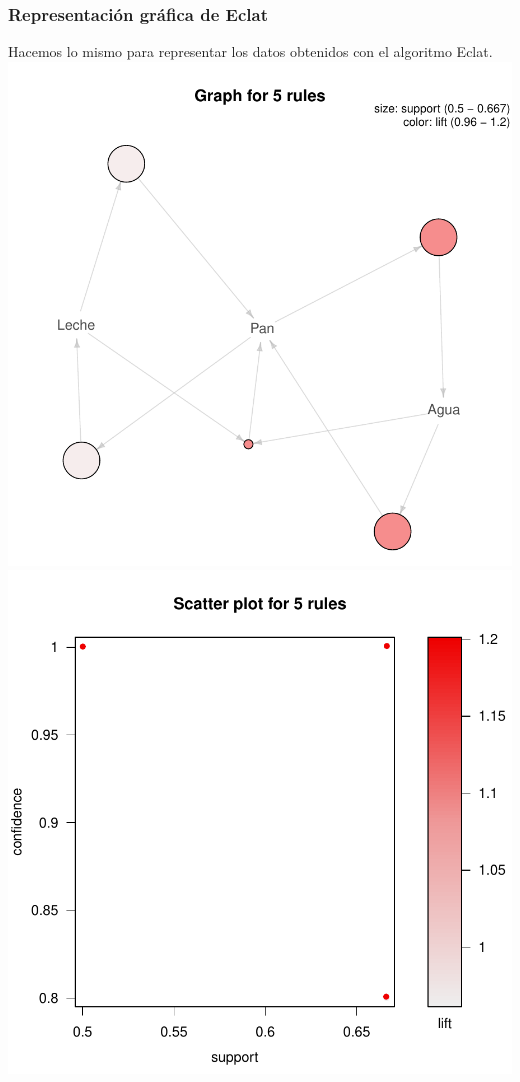 \documentclass [a4paper] {article}
\begin{document}
\subsubsection{Representación gráfica de Eclat}

Hacemos lo mismo para representar los datos obtenidos con el algoritmo Eclat.
\newline
\includegraphics{Memoria-Figura 3}
\newline
\includegraphics{Memoria-Figura 4}
\end{document}
